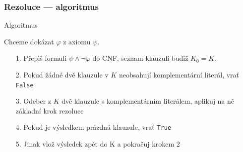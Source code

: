 \documentclass[red,professionalfont]{beamer}
\theoremstyle{definition}
\newcommand{\0}{\mbox{${\bf 0}$}}
\renewcommand{\emph}[1]{{\bf #1}}
\begin{document}
\begin{frame}[fragile]\frametitle{Rezoluce --- algoritmus}
\begin{block}{}
\begin{center}
Algoritmus\pause
\end{center}
\end{block}
\begin{center}
Chceme dokázat $\varphi$ z axiomu $\psi$.\pause
\end{center}
\begin{enumerate}
 \item[1.] Přepiš formuli $\psi\wedge\neg\varphi$ do CNF, seznam klauzulí budiž $K_0=K$.\pause
 \item[2.] Pokud žádné dvě klauzule v $K$ neobsahují komplementární literál, vrať {\tt False}\pause
 \item[3.] Odeber z $K$ dvě klauzule s komplementárním literálem, aplikuj na ně základní krok rezoluce\pause
 \item[4.] Pokud je výsledkem prázdná klauzule, vrať {\tt True}\pause
 \item[5.] Jinak vlož výsledek zpět do K a pokračuj krokem 2
\end{enumerate}


\end{frame}
\end{document}
